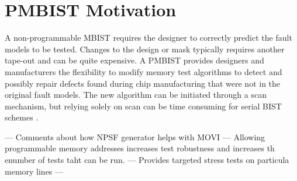 \section{PMBIST Motivation}
\label{sect:int-motivation}

A non-programmable MBIST requires the designer to correctly predict the fault models to be tested.  Changes to the design or mask typically requires another tape-out and can be quite expensive.  A PMBIST provides designers and manufacturers the flexibility to modify memory test algorithms to detect and possibly repair defects found during chip manufacturing that were not in the original fault models.  The new algorithm can be initiated through a scan mechanism, but relying solely on scan can be time consuming for serial BIST schemes \cite{748806}.

--- Comments about how NPSF generator helps with MOVI
--- Allowing programmable memory addresses increases test robustness and increases th enumber of tests taht can be run.  
--- Provides targeted stress tests on particula memory lines
--- 
